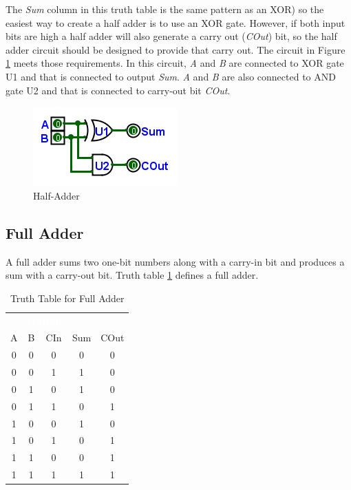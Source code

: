 The \emph{Sum} column in this truth table is the same pattern as an \textsf{XOR}) so the easiest way to create a half adder is to use an \textsf{XOR} gate. However, if both input bits are high a half adder will also generate a carry out (\emph{COut}) bit, so the half adder circuit should be designed to provide that carry out. The circuit in Figure \ref{fig:08_05} meets those requirements. In this circuit, \emph{A} and \emph{B} are connected to \textsf{XOR} gate \textsf{U1} and that is connected to output \emph{Sum}. \emph{A} and \emph{B} are also connected to \textsf{AND} gate \textsf{U2} and that is connected to carry-out bit \emph{COut}.

\begin{figure}[H]
	\centering
	\includegraphics[width=\maxwidth{.95\linewidth}]{gfx/08_05}
	\caption{Half-Adder}
	\label{fig:08_05}
\end{figure}

\subsection{Full Adder}
\label{CL:subsec:full_adder}

A full adder sums two one-bit numbers along with a carry-in bit and produces a sum with a carry-out bit. Truth table \ref{CL:tab:truth_table_for_full_adder} defines a full adder. 

\begin{table}[H]
  \sffamily
  \newcommand{\head}[1]{\textcolor{white}{\textbf{#1}}}    
  \begin{center}
    \begin{tabular}{ccc|cc} 
      \rowcolor{black!75}
      \multicolumn{3}{c}{\head{Inputs}} & \multicolumn{2}{c}{\head{Output}} \\
      A & B & CIn & Sum & COut \\
      \hline
      0 & 0 & 0 & 0 & 0 \\
      0 & 0 & 1 & 1 & 0 \\
      0 & 1 & 0 & 1 & 0 \\
      0 & 1 & 1 & 0 & 1 \\
      1 & 0 & 0 & 1 & 0 \\
      1 & 0 & 1 & 0 & 1 \\
      1 & 1 & 0 & 0 & 1 \\
      1 & 1 & 1 & 1 & 1
    \end{tabular}
  \end{center}
  \caption{Truth Table for Full Adder}
  \label{CL:tab:truth_table_for_full_adder}
\end{table}

